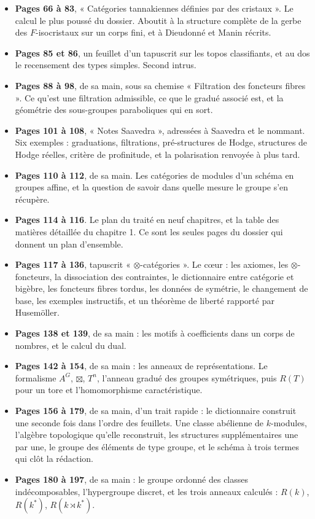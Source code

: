 \documentclass[11pt,a4paper]{article}
\begin{document}
\begin{itemize}
\item \textbf{Pages 66 à 83}, « Catégories tannakiennes définies par des
cristaux ». Le calcul le plus poussé du dossier. Aboutit à la structure
complète de la gerbe des $F$-isocristaux sur un corps fini, et à Dieudonné et
Manin récrits.

\item \textbf{Pages 85 et 86}, un feuillet d'un tapuscrit sur les topos
classifiants, et au dos le recensement des types simples. Second intrus.

\item \textbf{Pages 88 à 98}, de sa main, sous sa chemise « Filtration des
foncteurs fibres ». Ce qu'est une filtration admissible, ce que le gradué
associé est, et la géométrie des sous-groupes paraboliques qui en sort.

\item \textbf{Pages 101 à 108}, « Notes Saavedra », adressées à Saavedra et le
nommant. Six exemples : graduations, filtrations, pré-structures de Hodge,
structures de Hodge réelles, critère de profinitude, et la polarisation
renvoyée à plus tard.

\item \textbf{Pages 110 à 112}, de sa main. Les catégories de modules d'un
schéma en groupes affine, et la question de savoir dans quelle mesure le groupe
s'en récupère.

\item \textbf{Pages 114 à 116}. Le plan du traité en neuf chapitres, et la
table des matières détaillée du chapitre 1. Ce sont les seules pages du
dossier qui donnent un plan d'ensemble.

\item \textbf{Pages 117 à 136}, tapuscrit « $\otimes$-catégories ». Le cœur :
les axiomes, les $\otimes$-foncteurs, la dissociation des contraintes, le
dictionnaire entre catégorie et bigèbre, les foncteurs fibres tordus, les
données de symétrie, le changement de base, les exemples instructifs, et un
théorème de liberté rapporté par Husemöller.

\item \textbf{Pages 138 et 139}, de sa main : les motifs à coefficients dans un
corps de nombres, et le calcul du dual.

\item \textbf{Pages 142 à 154}, de sa main : les anneaux de représentations. Le
formalisme $A^{G}$, $\boxtimes$, $T^{n}$, l'anneau gradué des groupes
symétriques, puis $R(T)$ pour un tore et l'homomorphisme caractéristique.

\item \textbf{Pages 156 à 179}, de sa main, d'un trait rapide : le dictionnaire
construit une seconde fois dans l'ordre des feuillets. Une classe abélienne de $k$-modules, l'algèbre topologique
qu'elle reconstruit, les structures supplémentaires une par une, le groupe des
éléments de type groupe, et le schéma à trois termes qui clôt la rédaction.

\item \textbf{Pages 180 à 197}, de sa main : le groupe ordonné des classes
indécomposables, l'hypergroupe discret, et les trois anneaux calculés :
$R(k)$, $R(k^{*})$, $R(k \rtimes k^{*})$.
\end{itemize}
\end{document}
